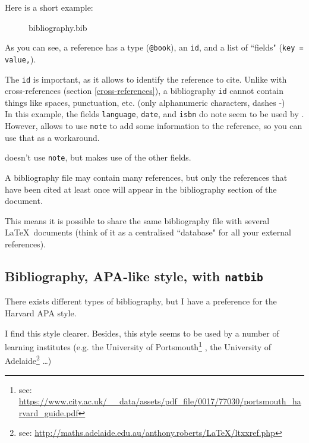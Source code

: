 Here is a short example:
\begin{figure}[h]
	\caption{bibliography.bib}
	\centering
	
\end{figure}

As you can see, a reference has a type (\texttt{@book}), an \texttt{id}, and a list of ``fields" (\texttt{key = value,}).

The \texttt{id} is important, as it allows to identify the reference to cite. Unlike with cross-references (section \ref{cross-references}), a bibliography \texttt{id} cannot contain things like spaces, punctuation, etc. (only alphanumeric characters, dashes -) \\

In this example, the fields \texttt{language}, \texttt{date}, and \texttt{isbn} do note seem to be used by . However,  allows to use \texttt{note} to add some information to the reference, so you can use that as a workaround.

 doesn't use \texttt{note}, but makes use of the other fields. \\ 


\begin{note}
A bibliography file may contain many references, but only the references that have been cited at least once will appear in the bibliography section of the document.
\end{note}

This means it is possible to share the same bibliography file with several \LaTeX\ documents (think of it as a centralised ``database" for all your external references).


\subsection{Bibliography, APA-like style, with \texttt{natbib}} \label{apa-biblio}


There exists different types of bibliography, but I have a preference for the Harvard APA style. 

I find this style clearer. 
Besides, this style seems to be used by a number of learning institutes (e.g. 
the University of Portsmouth\footnote{see: \url{https://www.city.ac.uk/__data/assets/pdf_file/0017/77030/portsmouth_harvard_guide.pdf}}
, the University of Adelaide\footnote{see: \url{http://maths.adelaide.edu.au/anthony.roberts/LaTeX/ltxxref.php}}
\ldots)

